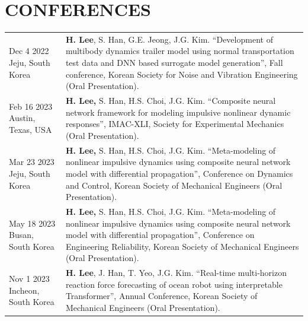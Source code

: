 \documentclass[a4paper,10pt]{extarticle}
\begin{document}
\section*{CONFERENCES}
\noindent
{}
\vspace*{-.5cm}
\begin{longtable}{LR}
    {Dec 4 2022 \linebreak Jeju, South Korea}    & \textbf{H. Lee}, S. Han, G.E. Jeong, J.G. Kim. “Development of multibody dynamics trailer model using normal transportation test data and DNN based surrogate model generation”, Fall conference, Korean Society for Noise and Vibration Engineering (Oral Presentation). \\
    {Feb 16 2023 \linebreak  Austin, Texas, USA} & \textbf{H. Lee,} S. Han, H.S. Choi, J.G. Kim. “Composite neural network framework for modeling impulsive nonlinear dynamic responses”, IMAC-XLI, Society for Experimental Mechanics (Oral Presentation).                                                                  \\
    {Mar 23 2023 \linebreak Jeju, South Korea}   & \textbf{H. Lee,} S. Han, H.S. Choi, J.G. Kim. “Meta-modeling of nonlinear impulsive dynamics using composite neural network model with differential propagation”, Conference on Dynamics and Control, Korean Society of Mechanical Engineers (Oral Presentation).         \\
    {May 18 2023 \linebreak Busan, South Korea}  & \textbf{H. Lee,} S. Han, H.S. Choi, J.G. Kim. “Meta-modeling of nonlinear impulsive dynamics using composite neural network model with differential propagation”, Conference on Engineering Reliability, Korean Society of Mechanical Engineers (Oral Presentation).      \\
    {Nov 1 2023 \linebreak Incheon, South Korea} & \textbf{H. Lee}, J. Han, T. Yeo, J.G. Kim. “Real-time multi-horizon reaction force forecasting of ocean robot using interpretable Transformer”, Annual Conference, Korean Society of Mechanical Engineers (Oral Presentation).                                            \\
\end{longtable}


\end{document}
